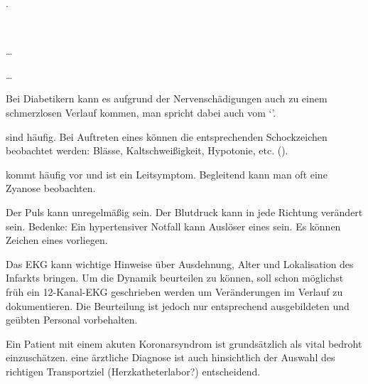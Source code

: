\documentclass[
ngerman,
paper=a4,
asymmetric,
fontsize=10pt,
draft=false,
numbers=noenddot,
bibtotocnumbered,
footnotes=multiple,
]{scrreprt}
\newcommand{\jALTende}{\newline{\color{red}\rule{\linewidth}{2pt}\newline}}
\newcommand{\jNEU}{\vspace{6pt}\noindent{\color{green}\sffamily\textbf{ADDED}\hrulefill\newline}}
\begin{document}
 {}
 {}
 {}
  .
  \jALTende
  
  \jNEU
  
{\TxABCDE}
{~
\begin{ABCDEText}
  \item[\ABCDE{3}]  \ldots
  \item[\ABCDE{4}] \ldots
     
   Bei Diabetikern kann es aufgrund der Nervenschädigungen
   auch zu einem schmerzlosen Verlauf kommen, man spricht
   dabei auch vom \enquote*{}.
   
    sind
   häufig.
   Bei Auftreten eines  können die
   entsprechenden Schockzeichen beobachtet werden: Blässe,
   Kaltschweißigkeit, Hypotonie, etc.
   ().
   \item[\ABCDE{B}]  kommt häufig vor und ist ein
   Leitsymptom.  Begleitend kann man oft eine Zyanose
   beobachten.
 \item[\ABCDE{C}] Der Puls kann unregelmäßig sein.   
  Der Blutdruck kann in jede Richtung
  verändert sein. Bedenke: Ein hypertensiver Notfall kann
  Auslöser eines  sein. Es
  können Zeichen eines  vorliegen. 
   
  \item[\ABCDE{E}]  Das EKG kann wichtige Hinweise über
   Ausdehnung, Alter und Lokalisation des Infarkts bringen.
   Um die Dynamik beurteilen zu können, soll schon möglichst
  früh ein 12-Kanal-EKG geschrieben werden um Veränderungen
  im Verlauf zu dokumentieren.
  Die Beurteilung ist jedoch nur entsprechend ausgebildeten
  und geübten Personal vorbehalten.
   \item[\ABCDE{=}]  Ein Patient mit einem  akuten
   Koronarsyndrom ist grundsätzlich als vital bedroht
   einzuschätzen. eine ärztliche Diagnose ist auch
   hinsichtlich der Auswahl des richtigen Transportziel
   (Herzkatheterlabor?) entscheidend.
 \end{ABCDEText}
 }
\end{document}
